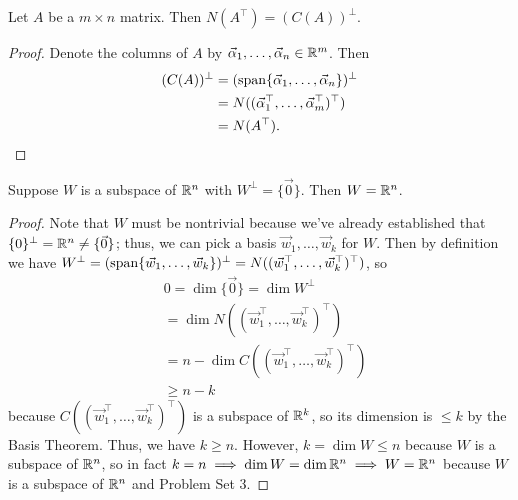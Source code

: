 \documentclass[main.tex]{subfiles}
\begin{document}
\begin{theorem}
    Let $A$ be a $m\times n$ matrix. Then $N(A^\top) = (C(A))^\perp$.
\end{theorem}
\begin{proof}
    Denote the columns of $A$ by $\vec{\alpha}_1, \ldots , \vec{\alpha}_n\in \mathbb R^m$. Then
    \begin{align*}
        (C(A))^\perp &= (\operatorname{span}\{\vec{\alpha}_1, \ldots , \vec{\alpha}_n\})^\perp \\
        &= N((\vec{\alpha}_1^\top, \ldots, \vec{\alpha}_m^\top)^\top) \\
        &= N(A^\top).\qedhere
    \end{align*}
\end{proof}

\begin{proposition}
    Suppose $W$ is a subspace of $\mathbb R^n$ with $W^\perp = \{\vec{0}\}$. Then $W = \mathbb R^n$.
\end{proposition}

\begin{proof}
    Note that $W$ must be nontrivial because we've already established that $\{0\}^\perp = \mathbb R^n\neq \{\vec{0}\}$; thus, we can pick a basis $\vec{w}_1, \ldots , \vec{w}_k$ for $W$. Then by definition we have $W^\perp = (\operatorname{span}\{\vec{w}_1, \ldots , \vec{w}_k\})^\perp = N((\vec{w}_1^\top, \ldots, \vec{w}_k^\top)^\top)$, so 
    \begin{align*}
    &0 = \dim\{\vec{0}\} = \dim W^\perp \\
    &= \dim N((\vec{w}_1^\top, \ldots, \vec{w}_k^\top)^\top) \\
    &= n - \dim C((\vec{w}_1^\top, \ldots, \vec{w}_k^\top)^\top) \\
    &\ge n - k
    \end{align*}
    because $C((\vec{w}_1^\top, \ldots, \vec{w}_k^\top)^\top)$ is a subspace of $\mathbb R^k$, so its dimension is $\le k$ by the Basis Theorem. Thus, we have $k\ge n$. However, $k = \dim W \le n$ because $W$ is a subspace of $\mathbb R^n$, so in fact $k = n\implies \dim W = \dim \mathbb R^n\implies W = \mathbb R^n$ because $W$ is a subspace of $\mathbb R^n$ and Problem Set 3.
\end{proof}
\end{document}
